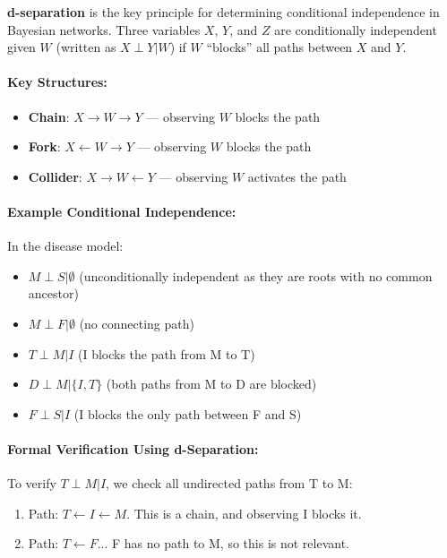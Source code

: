 \documentclass[conference]{IEEEtran}
\begin{document}
\textbf{d-separation} is the key principle for determining conditional independence in Bayesian networks. Three variables $X$, $Y$, and $Z$ are conditionally independent given $W$ (written as $X \perp Y | W$) if $W$ ``blocks'' all paths between $X$ and $Y$.

\paragraph{Key Structures:}
\begin{itemize}
    \item \textbf{Chain}: $X \rightarrow W \rightarrow Y$ --- observing $W$ blocks the path
    \item \textbf{Fork}: $X \leftarrow W \rightarrow Y$ --- observing $W$ blocks the path
    \item \textbf{Collider}: $X \rightarrow W \leftarrow Y$ --- observing $W$ activates the path
\end{itemize}

\paragraph{Example Conditional Independence:}
In the disease model:
\begin{itemize}
    \item $M \perp S | \emptyset$ (unconditionally independent as they are roots with no common ancestor)
    \item $M \perp F | \emptyset$ (no connecting path)
    \item $T \perp M | I$ (I blocks the path from M to T)
    \item $D \perp M | \{I, T\}$ (both paths from M to D are blocked)
    \item $F \perp S | I$ (I blocks the only path between F and S)
\end{itemize}

\paragraph{Formal Verification Using d-Separation:}
To verify $T \perp M | I$, we check all undirected paths from T to M:
\begin{enumerate}
    \item Path: $T \leftarrow I \leftarrow M$. This is a chain, and observing I blocks it.
    \item Path: $T \leftarrow F$... F has no path to M, so this is not relevant.
\end{enumerate}
\end{document}
